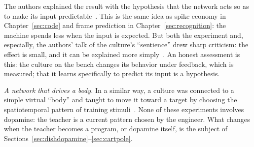 The authors explained the result with the hypothesis that the network acts so as to make its input predictable~\cite{Friston2010}. This is the same idea as spike economy in Chapter~\ref{sec:code} and frame prediction in Chapter~\ref{sec:recognition}: the machine spends less when the input is expected. But both the experiment and, especially, the authors' talk of the culture's ``sentience'' drew sharp criticism: the effect is small, and it can be explained more simply~\cite{Balci2023}. An honest assessment is this: the culture on the bench changes its behavior under feedback, which is measured; that it learns specifically to predict its input is a hypothesis.

\emph{A network that drives a body.} In a similar way, a culture was connected to a simple virtual ``body'' and taught to move it toward a target by choosing the spatiotemporal pattern of training stimuli~\cite{Bakkum2008}. None of these experiments involves dopamine: the teacher is a current pattern chosen by the engineer. What changes when the teacher becomes a program, or dopamine itself, is the subject of Sections~\ref{sec:dishdopamine}--\ref{sec:cartpole}.


